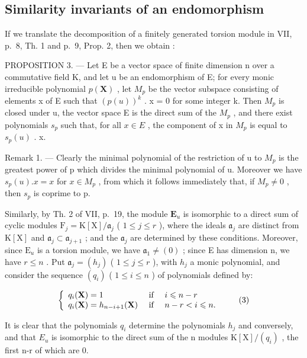 \subsection{Similarity invariants of an endomorphism}

If we translate the decomposition of a finitely generated torsion module in VII, p.~8, Th. 1 and p.~9, Prop. 2, then we obtain :

PROPOSITION 3. --- Let E be a vector space of finite dimension n over a commutative field K, and let u be an endomorphism of E; for every monic irreducible polynomial \(p(\mathbf{X})\) , let \(M_{p}\) be the vector subspace consisting of elements x of E such that \((p(u))^{k}\) . x = 0 for some integer k. Then \(M_{p}\) is closed under u, the vector space E is the direct sum of the \(M_{p}\) , and there exist polynomials \(s_{p}\) such that, for all \(x \in E\) , the component of x in \(M_{p}\) is equal to \(s_{p}(u)\) . x.

Remark 1. --- Clearly the minimal polynomial of the restriction of u to \(M_{p}\) is the greatest power of p which divides the minimal polynomial of u. Moreover we have \(s_{p}(u).x = x\) for \(x \in M_{p}\) , from which it follows immediately that, if \(M_{p} \neq 0\) , then \(s_{p}\) is coprime to p.

Similarly, by Th. 2 of VII, p.~19, the module \(\mathbf{E}_u\) is isomorphic to a direct sum of cyclic modules \(\mathrm{F}_j = \mathrm{K}[\mathrm{X}] / \mathfrak{a}_j\) ( \(1 \leqslant j \leqslant r\) ), where the ideals \(\mathfrak{a}_j\) are distinct from \(\mathrm{K}[\mathrm{X}]\) and \(\mathfrak{a}_j \subset \mathfrak{a}_{j+1}\) ; and the \(\mathfrak{a}_j\) are determined by these conditions. Moreover, since \(\mathrm{E}_u\) is a torsion module, we have \(\mathfrak{a}_1 \neq (0)\) ; since E has dimension n, we have \(r \leqslant n\) . Put \(\mathfrak{a}_j = (h_j)\) ( \(1 \leqslant j \leqslant r\) ), with \(h_j\) a monic polynomial, and consider the sequence \((q_i)\) ( \(1 \leqslant i \leqslant n\) ) of polynomials defined by:

\[
\left\{ \begin{array}{l l} q _ {i} (\mathbf {X}) = 1 & \text { if } \quad i \leqslant n - r \\ q _ {i} (\mathbf {X}) = h _ {n - i + 1} (\mathbf {X}) & \text { if } \quad n - r <   i \leqslant n. \end{array} \right.\tag{3}
\]

It is clear that the polynomials \(q_{i}\) determine the polynomials \(h_{j}\) and conversely, and that \(E_{u}\) is isomorphic to the direct sum of the n modules \(\mathrm{K}[\mathrm{X}]/(q_{i})\) , the first n-r of which are 0.

